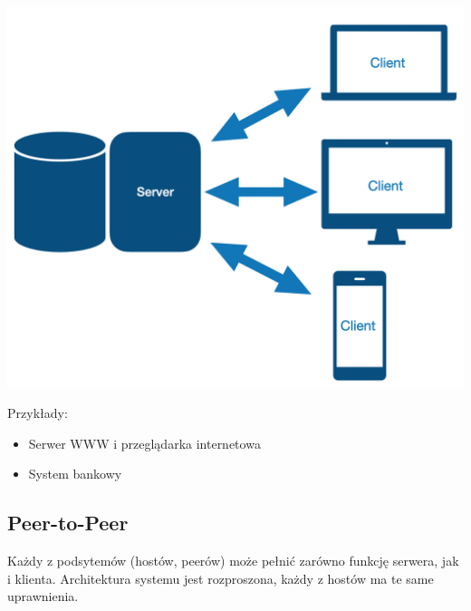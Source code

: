 \documentclass[12pt]{article}
\begin{document}
            \begin{center}
                \includegraphics[scale=0.30]{patterns/client-server.png}
            \end{center}

            Przykłady:
            \begin{itemize}
                \item Serwer WWW i przeglądarka internetowa
                \item System bankowy
            \end{itemize}

        \newpage
        \subsection{Peer-to-Peer}
            
            Każdy z podsytemów (hostów, peerów) może pełnić zarówno funkcję 
            serwera, jak i klienta. Architektura systemu jest rozproszona, każdy
            z hostów ma te same uprawnienia.
\end{document}
